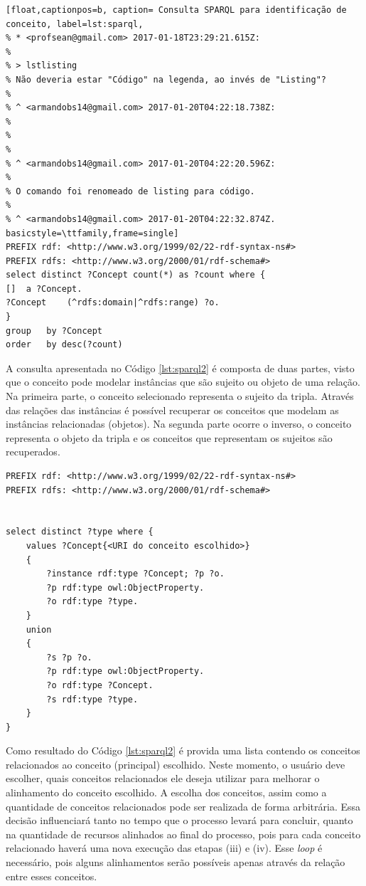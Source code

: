 \begin{lstlisting}[float,captionpos=b, caption= Consulta SPARQL para identificação de conceito, label=lst:sparql,
% * <profsean@gmail.com> 2017-01-18T23:29:21.615Z:
% 
% > lstlisting
% Não deveria estar "Código" na legenda, ao invés de "Listing"?
% 
% ^ <armandobs14@gmail.com> 2017-01-20T04:22:18.738Z:
% 
% 
% 
% ^ <armandobs14@gmail.com> 2017-01-20T04:22:20.596Z:
%
% O comando foi renomeado de listing para código.
%
% ^ <armandobs14@gmail.com> 2017-01-20T04:22:32.874Z.
basicstyle=\ttfamily,frame=single]
PREFIX rdf: <http://www.w3.org/1999/02/22-rdf-syntax-ns#>
PREFIX rdfs: <http://www.w3.org/2000/01/rdf-schema#>
select distinct ?Concept count(*) as ?count where {
[] 	a ?Concept.
?Concept 	(^rdfs:domain|^rdfs:range) ?o.
}
group 	by ?Concept	
order 	by desc(?count)
\end{lstlisting}

A consulta apresentada no Código \ref{lst:sparql2} é composta de duas partes, visto que o conceito pode modelar instâncias que são sujeito ou objeto de uma relação. Na primeira parte, o conceito selecionado representa o sujeito da tripla. Através das relações das instâncias é possível recuperar os conceitos que modelam as instâncias  relacionadas (objetos). Na segunda parte ocorre o inverso, o conceito representa o objeto da tripla e os conceitos que representam os sujeitos são recuperados.

\begin{lstlisting}[captionpos=b, caption=Query SPARQL para recuperação de conceitos relacionados, label=lst:sparql2,
   basicstyle=\ttfamily,frame=single]
PREFIX rdf: <http://www.w3.org/1999/02/22-rdf-syntax-ns#>
PREFIX rdfs: <http://www.w3.org/2000/01/rdf-schema#>


select distinct ?type where {
	values ?Concept{<URI do conceito escolhido>}
	{
		?instance rdf:type ?Concept; ?p ?o.
		?p rdf:type owl:ObjectProperty.
		?o rdf:type ?type.
	}
	union
	{
		?s ?p ?o.
		?p rdf:type owl:ObjectProperty.
		?o rdf:type ?Concept.
		?s rdf:type ?type.
	}
}

\end{lstlisting}

Como resultado do Código \ref{lst:sparql2} é provida uma lista contendo os conceitos relacionados ao conceito (principal) escolhido. Neste momento, o usuário deve escolher, quais conceitos relacionados ele deseja utilizar para melhorar o alinhamento do conceito escolhido. A escolha dos conceitos, assim como a quantidade de conceitos relacionados pode ser realizada de forma arbitrária. Essa decisão influenciará tanto no tempo que o processo levará para concluir, quanto na quantidade de recursos alinhados ao final do processo, pois para cada conceito relacionado haverá uma nova execução das etapas (iii) e (iv). Esse \textit{loop} é necessário, pois alguns alinhamentos serão possíveis apenas através da relação entre esses conceitos.

